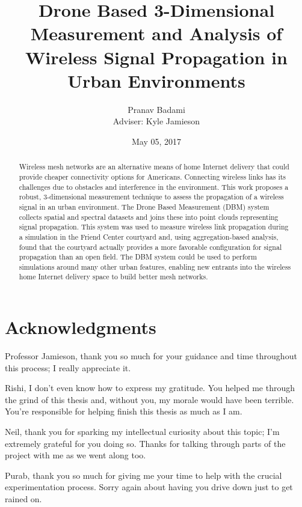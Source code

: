 \documentclass[pageno]{jpaper}
\begin{document}
\title{
Drone Based 3-Dimensional Measurement and Analysis of Wireless Signal Propagation in Urban Environments}

\author{Pranav Badami\\Adviser: Kyle Jamieson}

\date{May 05, 2017}
\maketitle

\thispagestyle{empty}
\doublespacing

\begin{abstract}
Wireless mesh networks are an alternative means of home Internet delivery that could provide cheaper connectivity options for Americans. Connecting wireless links has its challenges due to obstacles and interference in the environment. This work proposes a robust, 3-dimensional measurement technique to assess the propagation of a wireless signal in an urban environment. The Drone Based Measurement (DBM) system collects spatial and spectral datasets and joins these into point clouds representing signal propagation. This system was used to measure wireless link propagation during a simulation in the Friend Center courtyard and, using aggregation-based analysis, found that the courtyard actually provides a more favorable configuration for signal propagation than an open field. The DBM system could be used to perform simulations around many other urban features, enabling new entrants into the wireless home Internet delivery space to build better mesh networks.
\end{abstract}
\pagebreak
\section*{Acknowledgments}
Professor Jamieson, thank you so much for your guidance and time throughout this process; I really appreciate it. 

Rishi, I don't even know how to express my gratitude. You helped me through the grind of this thesis and, without you, my morale would have been terrible. You're responsible for helping finish this thesis as much as I am.

Neil, thank you for sparking my intellectual curiosity about this topic; I'm extremely grateful for you doing so. Thanks for talking through parts of the project with me as we went along too. 

Purab, thank you so much for giving me your time to help with the crucial experimentation process. Sorry again about having you drive down just to get rained on. 
\end{document}
